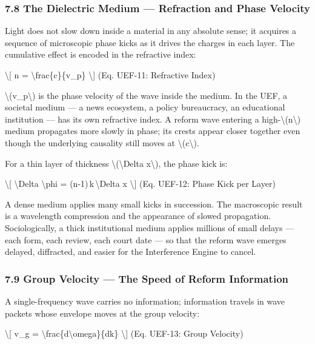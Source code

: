 {\protect{}
\subsubsection{7.8 The Dielectric Medium --- Refraction and Phase Velocity}\label{the-dielectric-medium-refraction-and-phase-velocity}

Light does not slow down inside a material in any absolute sense; it acquires a sequence of microscopic phase kicks as it drives the charges in each layer. The cumulative effect is encoded in the refractive index:

\textbackslash{[}
n = \textbackslash frac\{c\}\{v_p\}
\label{eq:uef-11}
\textbackslash{]} {(Eq. UEF-11: Refractive Index)}

\textbackslash(v_p\textbackslash) is the phase velocity of the wave inside the medium. In the UEF, a societal medium --- a news ecosystem, a policy bureaucracy, an educational institution --- has its own refractive index. A reform wave entering a high-\textbackslash(n\textbackslash) medium propagates more slowly in phase; its crests appear closer together even though the underlying causality still moves at \textbackslash(c\textbackslash).

For a thin layer of thickness \textbackslash(\textbackslash Delta x\textbackslash), the phase kick is:

\textbackslash{[}
\textbackslash Delta \textbackslash phi = (n-1)\,k\,\textbackslash Delta x
\label{eq:uef-12}
\textbackslash{]} {(Eq. UEF-12: Phase Kick per Layer)}

A dense medium applies many small kicks in succession. The macroscopic result is a wavelength compression and the appearance of slowed propagation. Sociologically, a thick institutional medium applies millions of small delays --- each form, each review, each court date --- so that the reform wave emerges delayed, diffracted, and easier for the Interference Engine to cancel.

\protect{}
\subsubsection{7.9 Group Velocity --- The Speed of Reform Information}\label{group-velocity-the-speed-of-reform-information}

A single-frequency wave carries no information; information travels in wave packets whose envelope moves at the group velocity:

\textbackslash{[}
v_g = \textbackslash frac\{d\textbackslash omega\}\{dk\}
\label{eq:uef-13}
\textbackslash{]} {(Eq. UEF-13: Group Velocity)}

}
